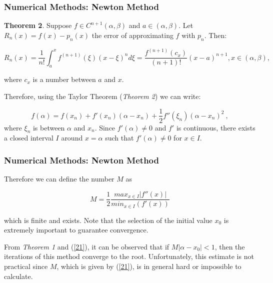 \documentclass{beamer}
\begin{document}
 \begin{frame}
\frametitle{Numerical Methods: Newton Method}
    \noindent \textbf{Theorem 2}. Suppose $f \in C^{n+1}(\alpha, \beta)$ and $a \in (\alpha,\beta)$. Let $R_n (x) = f(x) - p_n(x)$ the error of approximating $f$ with $p_n$. Then:
    \begin{ssmall}
        \begin{equation}\label{19}
            R_n(x) = \frac{1}{n!} \int_{a}^{x} f^(n+1)(\xi)(x-\xi)^n d\xi = \frac{f^(n+1)(c_x)}{(n+1)!}(x-a)^{n+1}, x \in (\alpha, \beta),
        \end{equation}
    \end{ssmall}
    \noindent where $c_x$ is a number between $a$ and $x$. \newline 
    
    Therefore, using the Taylor Theorem (\textit{Theorem 2}) we can write:

    \begin{equation}\label{20}
        f(\alpha) = f(x_n) + f'(x_n)(\alpha - x_n) + \frac{1}{2} f''(\xi_n)(\alpha - x_n)^2 \ ,
    \end{equation}
    where $\xi_n$ is between $\alpha$ and $x_n$. Since $f'(\alpha) \neq 0$ and $f'$ is continuous, there exists a closed interval $I$ around $x=\alpha$ such that $f'(\alpha) \neq 0$ for $x \in I$. 
\end{frame}

 \begin{frame}
\frametitle{Numerical Methods: Newton Method}
    Therefore we can define the number $M$ as
    
        \begin{equation}\label{21}
            M = \frac{1}{2} \frac{max_{x \in I}|f''(x)|}{min_{x \in I}(f'(x))}
        \end{equation}
    
    which is finite and exists. Note that the selection of the initial value $x_0$ is extremely important to guarantee convergence. \newline
    
    From \textit{Theorem 1} and (\ref{21}), it can be observed that if $M|\alpha - x_0| < 1$, then the iterations of this method converge to the root. Unfortunately, this estimate is not practical since $M$, which is given by (\ref{21}), is in general hard or impossible to calculate.

\end{frame}
\end{document}
